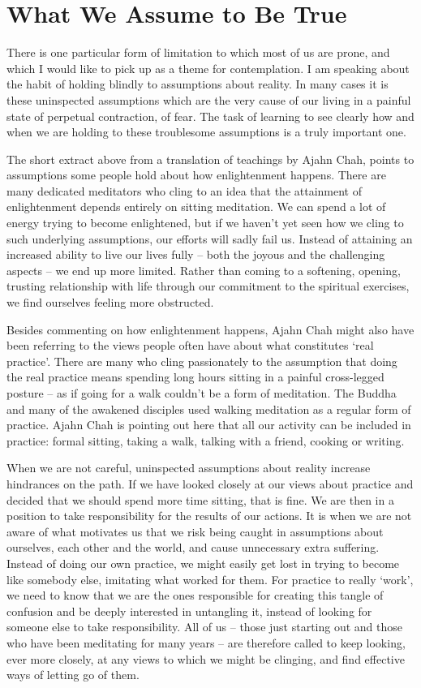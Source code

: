 \section{What We Assume to Be True}

There is one particular form of limitation to which most of us are
prone, and which I would like to pick up as a theme for contemplation. I
am speaking about the habit of holding blindly to assumptions about
reality. In many cases it is these uninspected assumptions which are the
very cause of our living in a painful state of perpetual contraction, of
fear. The task of learning to see clearly how and when we are holding to
these troublesome assumptions is a truly important one.

The short extract above from a translation of teachings by Ajahn Chah,
points to assumptions some people hold about how enlightenment happens.
There are many dedicated meditators who cling to an idea that the
attainment of enlightenment depends entirely on sitting meditation. We
can spend a lot of energy trying to become enlightened, but if we
haven’t yet seen how we cling to such underlying assumptions, our
efforts will sadly fail us. Instead of attaining an increased ability to
live our lives fully – both the joyous and the challenging aspects – we
end up more limited. Rather than coming to a softening, opening,
trusting relationship with life through our commitment to the spiritual
exercises, we find ourselves feeling more obstructed.

Besides commenting on how enlightenment happens, Ajahn Chah might also
have been referring to the views people often have about what
constitutes ‘real practice’. There are many who cling passionately to
the assumption that doing the real practice means spending long hours
sitting in a painful cross-legged posture – as if going for a walk
couldn’t be a form of meditation. The Buddha and many of the awakened
disciples used walking meditation as a regular form of practice. Ajahn
Chah is pointing out here that all our activity can be included in
practice: formal sitting, taking a walk, talking with a friend, cooking
or writing.

When we are not careful, uninspected assumptions about reality increase
hindrances on the path. If we have looked closely at our views about
practice and decided that we should spend more time sitting, that is
fine. We are then in a position to take responsibility for the results
of our actions. It is when we are not aware of what motivates us that we
risk being caught in assumptions about ourselves, each other and the
world, and cause unnecessary extra suffering. Instead of doing our own
practice, we might easily get lost in trying to become like somebody
else, imitating what worked for them. For practice to really ‘work’, we
need to know that we are the ones responsible for creating this tangle
of confusion and be deeply interested in untangling it, instead of
looking for someone else to take responsibility. All of us – those just
starting out and those who have been meditating for many years – are
therefore called to keep looking, ever more closely, at any views to
which we might be clinging, and find effective ways of letting go of
them.

